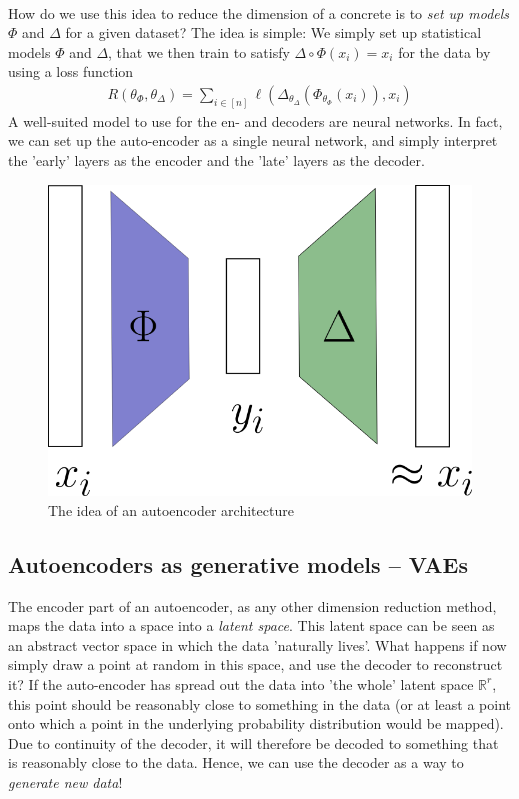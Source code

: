 \documentclass{article}
\newcommand{\R}{\mathbb{R}}
\begin{document}
\

How do we use this idea to reduce the dimension of a concrete  is to \emph{set up models} $\Phi$ and $\Delta$ for a given dataset? The idea is simple: We simply set up statistical models $\Phi$ and $\Delta$, that we then train to satisfy $\Delta \circ \Phi(x_i)=x_i$ for the data by using a loss function
\begin{align*}
    R(\theta_\Phi,\theta_\Delta) = \sum_{i \in [n]}\ell(\Delta_{\theta_\Delta}(\Phi_{\theta_\Phi}(x_i)),x_i)
\end{align*} A well-suited model to use for the en- and decoders are neural networks. In fact, we can set up the auto-encoder as a single neural network, and simply interpret the 'early' layers as the encoder and the 'late' layers as the decoder. 

\begin{figure}
    \centering
    \includegraphics[width=0.5\linewidth]{graphics/auto_encoder_architecture.png}
    \caption{The idea of an autoencoder architecture}
    \label{fig:placeholder}
\end{figure}

\subsection{Autoencoders as generative models -- VAEs}
The encoder part of an autoencoder, as any other dimension reduction method, maps the data into a space into a \emph{latent space}. This latent space can be seen as an abstract vector space in which the data 'naturally lives'. What happens if now simply draw a point at random in this space, and use the decoder to reconstruct it? If the auto-encoder has spread out the data  into 'the whole' latent space $\R^r$, this point should be reasonably close to something in the data (or at least a point onto which a point in the underlying probability distribution would be mapped). Due to continuity of the decoder, it will therefore be decoded to something that is reasonably close to the data. Hence, we can use the decoder as a way to \emph{generate new data}!
\end{document}
